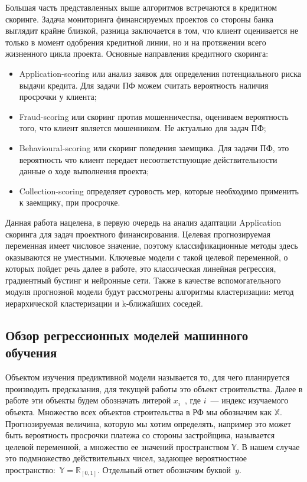 \documentclass[12pt,a4paper]{article} %
\begin{document}
Большая часть представленных выше алгоритмов встречаются в кредитном скоринге. Задача мониторинга финансируемых проектов со стороны банка выглядит крайне близкой, разница заключается в том, что  клиент оценивается не только в момент одобрения кредитной линии, но и на протяжении всего жизненного цикла проекта. Основные направления кредитного скоринга:
\begin{itemize}
	\item Application-scoring или анализ заявок для определения потенциального риска выдачи кредита. Для задачи ПФ можем считать вероятность наличия просрочки у клиента;
	\item Fraud-scoring или скоринг против мошенничества, оцениваем вероятность того, что клиент является мошенником. Не актуально для задач ПФ;
	\item Behavioural-scoring или скоринг поведения заемщика. Для задачи ПФ, это вероятность что клиент передает несоответствующие действительности данные о ходе выполнения проекта;
	\item Collection-scoring определяет суровость мер, которые необходимо применить к заемщику, при просрочке.
\end{itemize}

Данная работа нацелена, в первую очередь на анализ адаптации Application скоринга для задач проектного финансирования. Целевая прогнозируемая переменная имеет числовое значение, поэтому классификационные методы здесь оказываются не уместными. Ключевые модели с такой целевой переменной, о которых пойдет речь далее в работе, это классическая линейная регрессия, градиентный бустинг и нейронные сети. Также в качестве вспомогательного модуля прогнозной модели будут рассмотрены алгоритмы кластеризации: метод иерархической кластеризации и k-ближайших соседей.

\subsection{Обзор регрессионных моделей машинного обучения}

Объектом изучения предиктивной модели называется то, для чего планируется производить предсказания, для текущей работы это объект строительства. Далее в работе эти объекты будем обозначать литерой $x_i$~, где $i$~--- индекс изучаемого объекта. Множество всех объектов строительства в РФ мы обозначим как $\mathbb{X}$. Прогнозируемая величина, которую мы хотим определять, например это может быть вероятность просрочки платежа со стороны застройщика, называется целевой переменной, а множество ее значений пространством $\mathbb{Y}$.
В нашем случае это подмножество действительных чисел, задающее вероятностное пространство:~$\mathbb{Y} = \mathbb{R}_{[0,1]}$. Отдельный ответ обозначим буквой~$y$.
\end{document}

